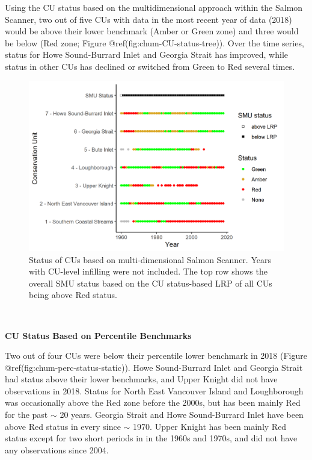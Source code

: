 \documentclass[
]{article}
\begin{document}
Using the CU status based on the multidimensional approach within the
Salmon Scanner, two out of five CUs with data in the most recent year of
data (2018) would be above their lower benchmark (Amber or Green zone)
and three would be below (Red zone; Figure
@ref(fig:chum-CU-status-tree)). Over the time series, status for Howe
Sound-Burrard Inlet and Georgia Strait has improved, while status in
other CUs has declined or switched from Green to Red several times.

\begin{figure}

{\centering \includegraphics[width=25in]{figure/fig_status_by_CU_perc_RelAbd} 

}

\caption{Status of CUs based on multi-dimensional Salmon Scanner. Years with CU-level infilling were not included. The top row shows the overall SMU status based on the CU status-based LRP of all CUs being above Red status.}\label{fig:chum-CU-status-tree}
\end{figure}

\hfill\break
~

\textbf{CU Status Based on Percentile Benchmarks}

Two out of four CUs were below their percentile lower benchmark in 2018
(Figure @ref(fig:chum-perc-status-static)). Howe Sound-Burrard Inlet and
Georgia Strait had status above their lower benchmarks, and Upper Knight
did not have observations in 2018. Status for North East Vancouver
Island and Loughborough was occasionally above the Red zone before the
2000s, but has been mainly Red for the past \(\sim\) 20 years. Georgia
Strait and Howe Sound-Burrard Inlet have been above Red status in every
since \(\sim\) 1970. Upper Knight has been mainly Red status except for
two short periods in in the 1960s and 1970s, and did not have any
observations since 2004.
\end{document}
